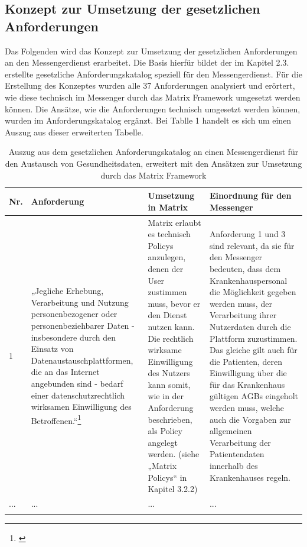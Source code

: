 \subsection{Konzept zur Umsetzung der gesetzlichen Anforderungen}\label{chapter:vdmf}
Das Folgenden wird das Konzept zur Umsetzung der gesetzlichen Anforderungen an den Messengerdienst erarbeitet.
Die Basis hierfür bildet der im Kapitel 2.3. erstellte gesetzliche Anforderungskatalog speziell für den Messengerdienst. Für die Erstellung des Konzeptes wurden alle 37 Anforderungen analysiert und erörtert, wie diese technisch im Messenger durch das Matrix Framework umgesetzt werden können. Die Ansätze, wie die Anforderungen technisch umgesetzt werden können, wurden im Anforderungskatalog ergänzt. Bei Tablle 1 handelt es sich um einen Auszug aus dieser erweiterten Tabelle. 
\newpage
\begin{longtable}{p{0.6cm}|p{4cm}|p{5cm}|p{5cm}}
    \hline
Nr. & Anforderung                                                                                                                                                                                                                                                                                          & Umsetzung in Matrix          & Einordnung für den Messenger                                                                                                                                                                                                                                                                                                                                                                                                                                                                                                                                        \\ \hline
1 &
  „Jegliche Erhebung, Verarbeitung und Nutzung personenbezogener oder personenbeziehbarer Daten - insbesondere durch den Einsatz von Datenaustauschplattformen, die an das Internet angebunden sind - bedarf einer datenschutzrechtlich wirksamen Einwilligung des Betroffenen.“\footnote{\cite[S. 41]{Bundesverband-Gesundheits-IT-e.V.2016}} &
  Matrix erlaubt es technisch Policys anzulegen, denen der User zustimmen muss, bevor er den Dienst nutzen kann. Die rechtlich wirksame Einwilligung des Nutzers kann somit, wie in der Anforderung beschrieben, als Policy angelegt werden. (siehe „Matrix Policys“ in Kapitel 3.2.2) &
  Anforderung 1 und 3 sind relevant, da sie für den Messenger bedeuten, dass dem Krankenhauspersonal die Möglichkeit gegeben werden muss, der Verarbeitung ihrer Nutzerdaten durch die Plattform zuzustimmen. Das gleiche gilt auch für die Patienten, deren Einwilligung über die für das Krankenhaus gültigen AGBs eingeholt werden muss, welche auch die Vorgaben zur allgemeinen Verarbeitung der Patientendaten innerhalb des Krankenhauses regeln.
  \\ \hline
... &
... &
... &
...
  \\ \hline

\caption{Auszug aus dem gesetzlichen Anforderungskatalog an einen Messengerdienst für den Austausch von Gesundheitsdaten, erweitert mit den Ansätzen zur Umsetzung durch das Matrix Framework} 
\end{longtable}

